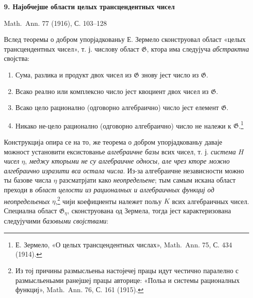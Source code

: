 ﻿\documentclass[11pt]{article}
\begin{document}
\begin{center}
{\Large\bfseries 9. Најобчејше области целых трансцендентных чисел}\par
\vspace{1.2em}
\mbox{Math. Ann.} 77 (1916), С. 103--128
\end{center}

\vspace{1em}

Вслед теоремы о добром упорјадкованьу Е. Зермело сконструовал област «целых трансцендентных чисел», т. ј. числову област $\mathfrak G$, ктора има следујуча {\itshape абстрактна} својства:
\begin{enumerate}
\item[I.] Сума, разлика и продукт двох чисел из $\mathfrak G$ знову јест число из $\mathfrak G$.
\item[II.] Всако реално или комплексно число јест квоциент двох чисел из $\mathfrak G$.
\item[III.] Всако цело рационално (одговорно алгебраично) число јест елемент $\mathfrak G$.
\item[IV.] Никако не-цело рационално (одговорно алгебраично) число не належи к $\mathfrak G$.\footnote{Е. Зермело, «О целых трансцендентных числах», \mbox{Math. Ann.} 75, С. 434 (1914).}
\end{enumerate}

Конструкција опира се на то, же теорема о добром упорјадкованьу даваје можност установити ексистованье {\itshape алгебраичне базы} всих чисел, т. ј. {\itshape система} $H$ {\itshape чисел} $\eta$, {\itshape меджу кторыми не су алгебраичне односы, але чрез кторе можно алгебраично изразити вса остала числа}. Из-за алгебраичне независности можно ты базове числа $\eta$ разсматрјати како {\itshape неопредельене}; тым самым искана област преходи в {\itshape област целости из рационалных и алгебраичных функциј од неопредельеных} $\eta$,\footnote{Из тој причины размысльеньа настојечеј працы идут честично паралелно с размысльеньами ранејшеј працы авторице: «Польа и системы рационалных функциј», \mbox{Math. Ann.} 76, С. 161 (1915).} чији коефициенты належет польу $K$ всих алгебраичных чисел. Специална област $\mathfrak G_\eta$, сконструована од Зермела, тогда јест карактеризована следујучими {\itshape базовыми својствами}:
\end{document}
